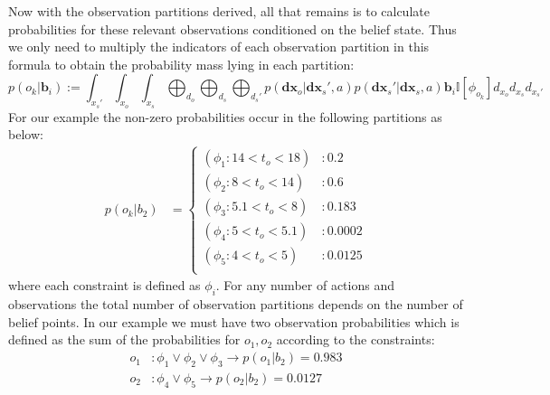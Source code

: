 \documentclass{article} %
\renewcommand{\vec}[1]{\mathbf{#1}} %
\newcommand{\xds}{\mathbf{dx}_s}
\newcommand{\xdo}{\mathbf{dx}_o}
\begin{document}
Now with the observation partitions derived, all that remains is to
calculate probabilities for these relevant observations conditioned on
the belief state. 
% 
Thus we only need to multiply the indicators of each observation partition 
in this formula to obtain the probability mass lying in each
partition:
$$p(o_k|\vec{b}_i) := \int_{x_s'}\int_{x_o}\int_{x_s} \bigoplus_{d_o} \bigoplus_{d_s} \bigoplus_{d_s'} p(\xdo|\xds',a) p(\xds'|\xds,a) \vec{b}_i  \mathbb{I}[\phi_{o_k}] d_{x_o} d_{x_s}d_{x_s'}$$
For our example the non-zero probabilities occur in the following partitions as below:
{\footnotesize
\vspace{-2mm}
\begin{align}
p(o_k|b_2) &= 
\begin{cases}
(\phi_1 : 14 < t_o< 18) & : 0.2\\
(\phi_2 : 8 < t_o< 14) & :  0.6\\
(\phi_3 : 5.1 < t_o< 8) & : 0.183\\
(\phi_4 : 5 < t_o< 5.1) & : 0.0002\\
(\phi_5 : 4 < t_o< 5) & :  0.0125\\
\end{cases}
\nonumber
\end{align}
}
where each constraint is defined as $\phi_i$. For any number of actions and observations the total number of observation partitions depends on the number of belief points. In our example we must have two observation probabilities which is defined as the sum of the probabilities for $o_1,o_2$ according to the constraints: 
\begin{align*}
o_1&: \phi_1 \vee \phi_2 \vee \phi_3 \longrightarrow p(o_1|b_2)=0.983 \\
o_2&: \phi_4 \vee \phi_5  \longrightarrow p(o_2|b_2)=0.0127
\end{align*}
\end{document}
